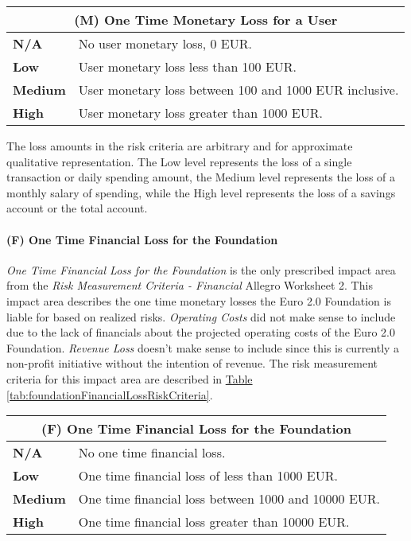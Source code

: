 \documentclass[12pt]{article} %
\newcommand{\hypertableref}[1]{\hyperref[#1]{Table \ref{#1}}}
\begin{document}
{\begin{center}
\begin{tabular}{ | l | p{12cm} | }
  \hline
  \multicolumn{2}{|c|}{\textbf{(M) One Time Monetary Loss for a User}}
  \\ \hline
  \textbf{N/A} & No user monetary loss, 0 EUR.
  \\ \hline
  \textbf{Low} & User monetary loss less than 100 EUR.
  \\ \hline
  \textbf{Medium} & User monetary loss between 100 and 1000 EUR inclusive.
  \\ \hline
  \textbf{High} & User monetary loss greater than 1000 EUR.
  \\ \hline
\end{tabular}
\end{center}
\label{tab:userMonetaryLossRiskCriteria}

The loss amounts in the risk criteria are arbitrary and for approximate qualitative representation. The Low level represents the loss of a single transaction or daily spending amount, the Medium level represents the loss of a monthly salary of spending, while the High level represents the loss of a savings account or the total account.

\paragraph{(F) One Time Financial Loss for the Foundation}

\textit{One Time Financial Loss for the Foundation} is the only prescribed impact area from the \textit{Risk Measurement Criteria - Financial} Allegro Worksheet 2. This impact area describes the one time monetary losses the Euro 2.0 Foundation is liable for based on realized risks. \textit{Operating Costs} did not make sense to include due to the lack of financials about the projected operating costs of the Euro 2.0 Foundation. \textit{Revenue Loss} doesn't make sense to include since this is currently a non-profit initiative without the intention of revenue. The risk measurement criteria for this impact area are described in \hypertableref{tab:foundationFinancialLossRiskCriteria}.

\begin{center}
\begin{tabular}{ | l | p{12cm} | }
  \hline
  \multicolumn{2}{|c|}{\textbf{(F) One Time Financial Loss for the Foundation}}
  \\ \hline
  \textbf{N/A} & No one time financial loss.
  \\ \hline
  \textbf{Low} & One time financial loss of less than 1000 EUR.
  \\ \hline
  \textbf{Medium} & One time financial loss between 1000 and 10000 EUR.
  \\ \hline
  \textbf{High} & One time financial loss greater than 10000 EUR.
  \\ \hline
\end{tabular}
\end{center}
\label{tab:foundationFinancialLossRiskCriteria}

}
\end{document}
